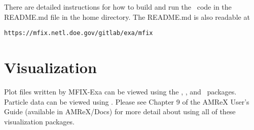There are detailed instructions for how to build and run the \mfix\ code in
the README.md file in the home directory.   The README.md is also readable at

\begin{verbatim}
https://mfix.netl.doe.gov/gitlab/exa/mfix
\end{verbatim}

\section{Visualization}

Plot files written by MFIX-Exa can be viewed using the 
\visit, \paraview, and \yt\ packages.  Particle data can be viewed using \paraview.
Please see Chapter 9 of the AMReX User's Guide (available in AMReX/Docs)
for more detail about using all of these visualization packages.
